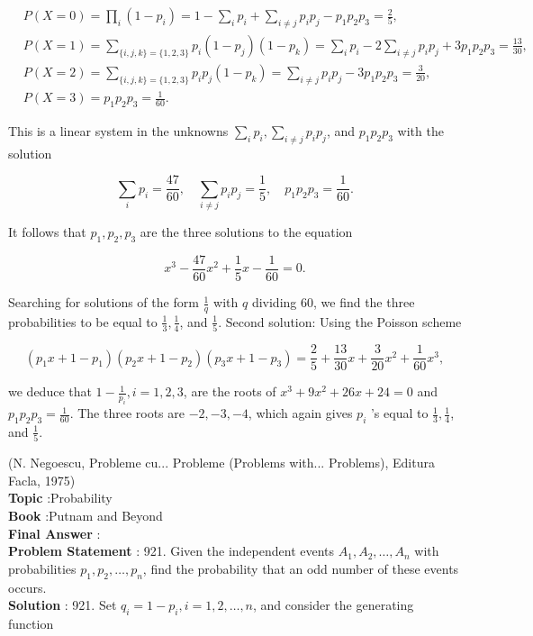 \documentclass[10pt]{article}
\begin{document}
$$
\begin{aligned}
&P(X=0)=\prod_{i}\left(1-p_{i}\right)=1-\sum_{i} p_{i}+\sum_{i \neq j} p_{i} p_{j}-p_{1} p_{2} p_{3}=\frac{2}{5}, \\
&P(X=1)=\sum_{\{i, j, k\}=\{1,2,3\}} p_{i}\left(1-p_{j}\right)\left(1-p_{k}\right)=\sum_{i} p_{i}-2 \sum_{i \neq j} p_{i} p_{j}+3 p_{1} p_{2} p_{3}=\frac{13}{30}, \\
&P(X=2)=\sum_{\{i, j, k\}=\{1,2,3\}} p_{i} p_{j}\left(1-p_{k}\right)=\sum_{i \neq j} p_{i} p_{j}-3 p_{1} p_{2} p_{3}=\frac{3}{20}, \\
&P(X=3)=p_{1} p_{2} p_{3}=\frac{1}{60} .
\end{aligned}
$$

This is a linear system in the unknowns $\sum_{i} p_{i}, \sum_{i \neq j} p_{i} p_{j}$, and $p_{1} p_{2} p_{3}$ with the solution

$$
\sum_{i} p_{i}=\frac{47}{60}, \quad \sum_{i \neq j} p_{i} p_{j}=\frac{1}{5}, \quad p_{1} p_{2} p_{3}=\frac{1}{60} .
$$

It follows that $p_{1}, p_{2}, p_{3}$ are the three solutions to the equation

$$
x^{3}-\frac{47}{60} x^{2}+\frac{1}{5} x-\frac{1}{60}=0 .
$$

Searching for solutions of the form $\frac{1}{q}$ with $q$ dividing 60, we find the three probabilities to be equal to $\frac{1}{3}, \frac{1}{4}$, and $\frac{1}{5}$. Second solution: Using the Poisson scheme

$$
\left(p_{1} x+1-p_{1}\right)\left(p_{2} x+1-p_{2}\right)\left(p_{3} x+1-p_{3}\right)=\frac{2}{5}+\frac{13}{30} x+\frac{3}{20} x^{2}+\frac{1}{60} x^{3},
$$

we deduce that $1-\frac{1}{p_{i}}, i=1,2,3$, are the roots of $x^{3}+9 x^{2}+26 x+24=0$ and $p_{1} p_{2} p_{3}=\frac{1}{60}$. The three roots are $-2,-3,-4$, which again gives $p_{i}$ 's equal to $\frac{1}{3}, \frac{1}{4}$, and $\frac{1}{5}$.

(N. Negoescu, Probleme cu... Probleme (Problems with... Problems), Editura Facla, 1975)
\\
\textbf{Topic} :Probability\\
\textbf{Book} :Putnam and Beyond\\
\textbf{Final Answer} :\\


\textbf{Problem Statement} :
921. Given the independent events $A_{1}, A_{2}, \ldots, A_{n}$ with probabilities $p_{1}, p_{2}, \ldots, p_{n}$, find the probability that an odd number of these events occurs.
\\
\textbf{Solution} :
921. Set $q_{i}=1-p_{i}, i=1,2, \ldots, n$, and consider the generating function
\end{document}
